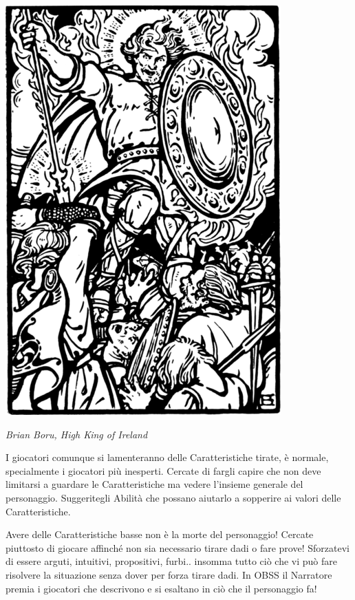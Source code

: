 \begin{multicols}{2}
\begin{center}
	\includegraphics[width=0.9\linewidth]{immagini/guerrieroispirato.png}

	\emph{Brian Boru, High King of Ireland}
\end{center}


\begin{changemargin}{0.3cm}{0.3cm}\begin{narratore}
I giocatori comunque si lamenteranno delle Caratteristiche tirate, è normale, specialmente i giocatori più inesperti. Cercate di fargli capire che non deve limitarsi a guardare le Caratteristiche ma vedere l'insieme generale del personaggio. Suggeritegli Abilità che possano aiutarlo a sopperire ai valori delle Caratteristiche.
\end{narratore}\end{changemargin}

\medskip

\begin{changemargin}{0.3cm}{0.3cm}\begin{tcolorbox}[title = Il Personaggio fa schifo! - Caratteristiche basse]
Avere delle Caratteristiche basse non è la morte del personaggio! Cercate piuttosto di giocare affinché non sia necessario tirare dadi o fare prove! Sforzatevi di essere arguti, intuitivi, propositivi, furbi.. insomma tutto ciò che vi può fare risolvere la situazione senza dover per forza tirare dadi. In OBSS il Narratore premia i giocatori che descrivono e si esaltano in ciò che il personaggio fa!
\end{tcolorbox}\end{changemargin}


\end{multicols}
